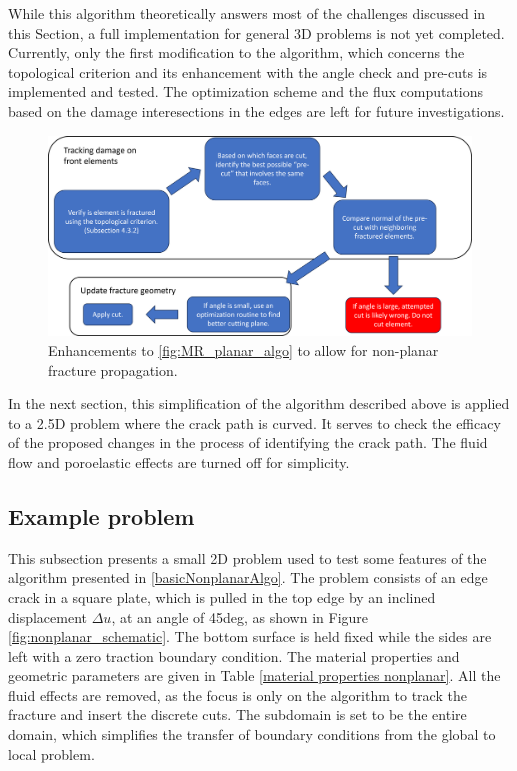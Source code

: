 While this algorithm theoretically answers most of the challenges discussed in this Section, a full implementation for general 3D problems is not yet completed. Currently, only the first modification to the algorithm, which concerns the topological criterion and its enhancement with the angle check and pre-cuts is implemented and tested. The optimization scheme and the flux computations based on the damage interesections in the edges are left for future investigations. 

\begin{figure}[h]
    \centering
    \includegraphics[width=\linewidth]{Chapter4/figures/nonplanar/nonplanar_algo.png}
    \caption{Enhancements to \ref{fig:MR_planar_algo} to allow for non-planar fracture propagation.}
    \label{fig:nonplanar_algo}
\end{figure}


In the next section, this simplification of the algorithm described above is applied to a 2.5D problem where the crack path is curved. It serves to check the efficacy of the proposed changes in the process of identifying the crack path. The fluid flow and poroelastic effects are turned off for simplicity.

\subsection{Example problem}

This subsection presents a small 2D problem used to test some features of the algorithm presented in \ref{basicNonplanarAlgo}. The problem consists of an edge crack in a square plate, which is pulled in the top edge by an inclined displacement $\Delta u$, at an angle of 45deg, as shown in Figure \ref{fig:nonplanar_schematic}. The bottom surface is held fixed while the sides are left with a zero traction boundary condition. The material properties and geometric parameters are given in Table \ref{material properties nonplanar}. All the fluid effects are removed, as the focus is only on the algorithm to track the fracture and insert the discrete cuts. The subdomain is set to be the entire domain, which simplifies the transfer of boundary conditions from the global to local problem. 

